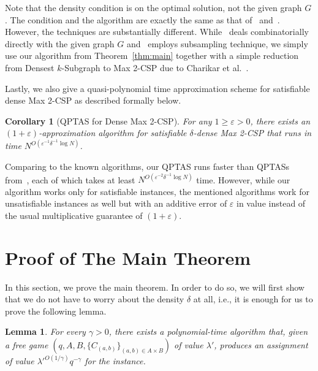 \documentclass{article}
\newtheorem{lemma}{Lemma}
\newtheorem{corollary}{Corollary}
\begin{document}
Note that the density condition is on the optimal solution, not the given graph $G$. The condition and the algorithm are exactly the same as that of~\cite{FPK01} and~\cite{ST05}. However, the techniques are substantially different. While~\cite{FPK01} deals combinatorially directly with the given graph $G$ and~\cite{ST05} employs subsampling technique, we simply use our algorithm from Theorem~\ref{thm:main} together with a simple reduction from {\sc Densest $k$-Subgraph} to {\sc Max 2-CSP} due to Charikar et al.~\cite{CHK}.

Lastly, we also give a quasi-polynomial time approximation scheme for satisfiable dense {\sc Max 2-CSP} as described formally below. \\

\begin{corollary}[QPTAS for Dense {Max 2-CSP}] \label{cor:qptas-dense}
  For any $1 \geq \varepsilon > 0$, there exists an $(1 + \varepsilon)$-approximation algorithm for satisfiable $\delta$-dense {\sc Max 2-CSP} that runs in time $N^{O(\varepsilon^{-1}\delta^{-1}\log N)}$.
\end{corollary}

Comparing to the known algorithms, our QPTAS runs faster than QPTASs from~\cite{Alon:2003:RSA:963875.963877, AKK95, BMHS11}, each of which takes at least $N^{O(\varepsilon^{-2}\delta^{-1}\log N)}$ time. However, while our algorithm works only for satisfiable instances, the mentioned algorithms work for unsatisfiable instances as well but with an additive error of $\varepsilon$ in value instead of the usual multiplicative guarantee of $(1 + \varepsilon)$.

\section{Proof of The Main Theorem}

In this section, we prove the main theorem. In order to do so, we will first show that we do not have to worry about the density $\delta$ at all, i.e., it is enough for us to prove the following lemma. \\

\begin{lemma} \label{lem:main}
  For every $\gamma > 0$, there exists a polynomial-time algorithm that, given a free game $(q, A, B, \{C_{(a, b)}\}_{(a, b) \in A \times B})$ of value $\lambda'$, produces an assignment of value $\lambda'^{O(1/\gamma)}q^{-\gamma}$ for the instance.
\end{lemma}
\end{document}
